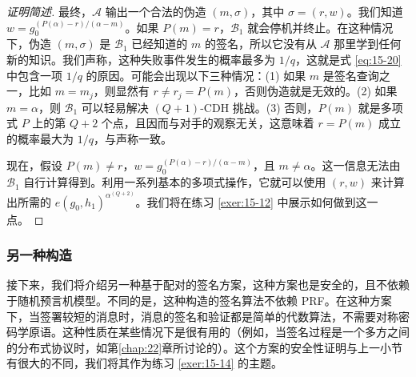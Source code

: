 \begin{proof}[证明简述]
最终，$\mathcal{A}$ 输出一个合法的伪造 $(m,\sigma)$，其中 $\sigma=(r,w)$。我们知道 $w=g_0^{(P(\alpha)-r)/(\alpha-m)}$。如果 $P(m)=r$，$\mathcal{B}_1$ 就会停机并终止。在这种情况下，伪造 $(m,\sigma)$ 是 $\mathcal{B}_1$ 已经知道的 $m$ 的签名，所以它没有从 $\mathcal{A}$ 那里学到任何新的知识。我们声称，这种失败事件发生的概率最多为 $1/q$，这就是式 \ref{eq:15-20} 中包含一项 $1/q$ 的原因。可能会出现以下三种情况：(1) 如果 $m$ 是签名查询之一，比如 $m=m_j$，则显然有 $r\neq r_j=P(m)$，否则伪造就是无效的。(2) 如果 $m=\alpha$，则 $\mathcal{B}_1$ 可以轻易解决 $(Q+1)$-CDH 挑战。(3) 否则，$P(m)$ 就是多项式 $P$ 上的第 $Q+2$ 个点，且因而与对手的观察无关，这意味着 $r=P(m)$ 成立的概率最大为 $1/q$，与声称一致。

现在，假设 $P(m)\neq r$，$w=g_0^{(P(\alpha)-r)/(\alpha-m)}$，且 $m\neq\alpha$。这一信息无法由 $\mathcal{B}_1$ 自行计算得到。利用一系列基本的多项式操作，它就可以使用 $(r,w)$ 来计算出所需的 $e(g_0,h_1)^{\alpha^{(Q+2)}}$。我们将在练习 \ref{exer:15-12} 中展示如何做到这一点。
\end{proof}
 
\subsubsection{另一种构造}\label{subsubsec:15-5-4-1}

接下来，我们将介绍另一种基于配对的签名方案，这种方案也是安全的，且不依赖于随机预言机模型。不同的是，这种构造的签名算法不依赖 PRF。在这种方案下，当签署较短的消息时，消息的签名和验证都是简单的代数算法，不需要对称密码学原语。这种性质在某些情况下是很有用的（例如，当签名过程是一个多方之间的分布式协议时，如第\ref{chap:22}章所讨论的）。这个方案的安全性证明与上一小节有很大的不同，我们将其作为练习 \ref{exer:15-14} 的主题。

\vspace*{5pt}

